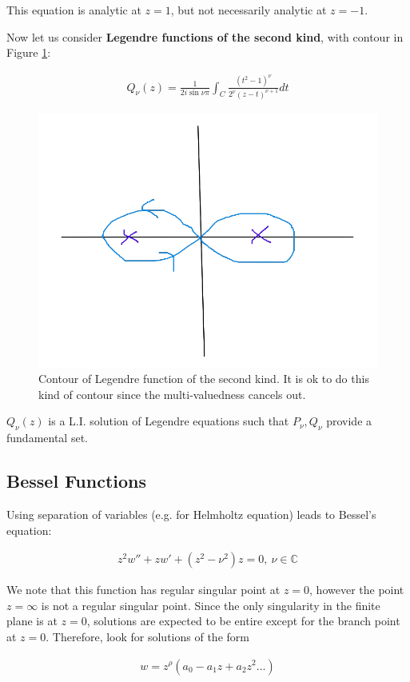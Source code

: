 \documentclass{article}
\theoremstyle{definition}
\def\C{\mathbb{C}}
\begin{document}
This equation is analytic at $z=1$, but not necessarily analytic at $z=-1$.

Now let us consider \textbf{Legendre functions of the second kind}, with contour in Figure \ref{fig:leg2}:

\begin{align*}
Q_\nu(z) = \frac{1}{2i\sin \nu \pi } \int_C \frac{(t^2-1)^\nu}{2^\nu (z-t)^{\nu+1}}dt 
\end{align*}

\begin{figure}[H]
	\centering
	\includegraphics[width=0.7\linewidth]{leg_2}
	\caption{Contour of Legendre function of the second kind. It is ok to do this kind of contour since the multi-valuedness cancels out.}
	\label{fig:leg2}
\end{figure}

$Q_\nu(z)$ is a L.I. solution of Legendre equations such that $P_\nu, Q_\nu$ provide a fundamental set.

\subsection{Bessel Functions}
Using separation of variables (e.g. for Helmholtz equation) leads to Bessel's equation:

\begin{align}\label{eq:bes}
z^2 w'' + z w' + (z^2-\nu^2)z=0,\ \nu \in \C
\end{align}

We note that this function has regular singular point at $z=0$, however the point $z=\infty$ is not a regular singular point. Since the only singularity in the finite plane is at $z=0$, solutions are expected to be entire except for the branch point at $z=0$. Therefore, look for solutions of the form 

\begin{align*}
w=z^\rho (a_0 - a_1z + a_2z^2...)
\end{align*}
\end{document}
